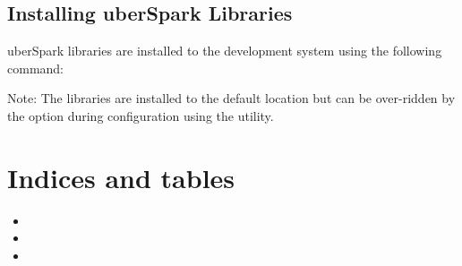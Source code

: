 \documentclass[letterpaper,10pt,english]{sphinxmanual}
\begin{document}
\begin{sphinxVerbatim}[commandchars=\\\{\}]
 
\end{sphinxVerbatim}


\section{Installing uberSpark Libraries}
\label{\detokenize{verify-build-install-libs:installing-uberspark-libraries}}
uberSpark libraries are installed to the development system using the following
command:

\begin{sphinxVerbatim}[commandchars=\\\{\}]
  
\end{sphinxVerbatim}

Note: The libraries are installed to the default location  but can
be over-ridden by the  option during configuration using the 
utility.


\chapter{Indices and tables}
\label{\detokenize{index:indices-and-tables}}\begin{itemize}
\item {} 

\item {} 

\item {} 

\end{itemize}



\renewcommand{\indexname}{Index}
\printindex
\end{document}
